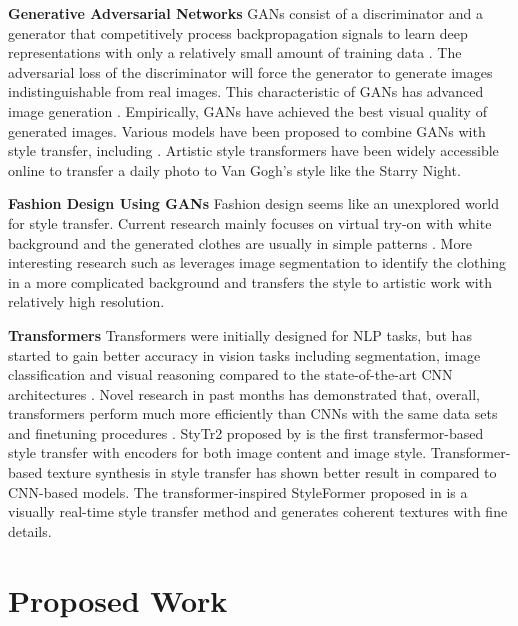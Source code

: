 \documentclass{article}
\begin{document}
\textbf{Generative Adversarial Networks} GANs consist of a discriminator and a generator that competitively process backpropagation signals to learn deep representations with only a relatively small amount of training data \cite{goodfellow2014GAN, creswell2018GANoverview}. The adversarial loss of the discriminator will force the generator to generate images indistinguishable from real images. This characteristic of GANs has advanced image generation \cite{denton2015deepGAN, radford2015unsupervisedGAN}. Empirically, GANs have achieved the best visual quality of generated images. Various models have been proposed to combine GANs with style transfer, including \cite{Gated-GAN, DRB-GAN, AgarPlateGAN}. Artistic style transformers have been widely accessible online to transfer a daily photo to Van Gogh's style like the Starry Night. 

\textbf{Fashion Design Using GANs} Fashion design seems like an unexplored world for style transfer. Current research mainly focuses on virtual try-on with white background and the generated clothes are usually in simple patterns \cite{kato2019ganClothing, yildirim2019customOutfits, rostamzadeh2018fashion-gen, hsiao2019fashion++, ak2019attributeGAN, liu2021fashionVisTool}. More interesting research such as \cite{wang2020fashionSegmentation} leverages image segmentation to identify the clothing in a more complicated background and transfers the style to artistic work with relatively high resolution. 

\textbf{Transformers} Transformers were initially designed for NLP tasks, but has started to gain better accuracy in vision tasks including segmentation, image classification and visual reasoning compared to the state-of-the-art CNN architectures \cite{khan2021CVtransSurvey}. Novel research in past months has demonstrated that, overall, transformers perform much more efficiently than CNNs with the same data sets and finetuning procedures \cite{malpure2021finetuneTrans}. StyTr2 proposed by \cite{deng2021stytr} is the first transfermor-based style transfer with encoders for both image content and image style. Transformer-based texture synthesis in style transfer has shown better result in \cite{lu2022transTextureSynthesis} compared to CNN-based models. The transformer-inspired StyleFormer proposed in \cite{wu2021styleformer} is a visually real-time style transfer method and generates coherent textures with fine details. 


\section{Proposed Work}
\end{document}
